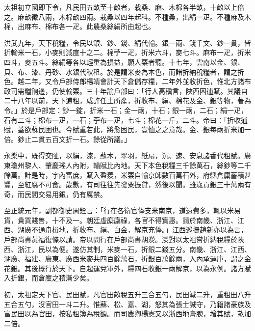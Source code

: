 太祖初立國即下令，凡民田五畝至十畝者，栽桑、麻、木棉各半畝，十畝以上倍之。麻畝徵八兩，木棉畝四兩。栽桑以四年起科。不種桑，出絹一疋。不種麻及木棉，出麻布、棉布各一疋。此農桑絲絹所由起也。

洪武九年，天下稅糧，令民以銀、鈔、錢、絹代輸。銀一兩、錢千文、鈔一貫，皆折輸米一石，小麥則減直十之二。棉苧一疋，折米六斗，麥七斗。麻布一疋，折米四斗，麥五斗。絲絹等各以輕重為損益，願人粟者聽。十七年，雲南以金、銀、貝、布、漆、丹砂、水銀代秋租。於是謂米麥為本色，而諸折納稅糧者，謂之折色。越二年，又令戶部侍郎楊靖會計天下倉儲存糧，二年外並收折色，惟北方諸布政司需糧餉邊，仍使輸粟。三十年諭戶部曰：「行人高稹言，陜西困逋賦。其議自二十八年以前，天下逋租，咸許任土所產，折收布、絹、棉花及金、銀等物，著為令。」於是戶部定：鈔一錠，折米一石；金一兩，十石；銀一兩，二石；絹一疋，石有二斗；棉布一疋，一石；苧布一疋，七斗；棉花一斤，二斗。帝曰：「折收逋賦，蓋欲蘇民困也。今賦重若此，將愈困民，豈恤之之意哉。金、銀每兩折米加一倍。鈔止二貫五百文折一石。餘從所議。」

永樂中，既得交阯，以絹，漆，蘇木，翠羽，紙扇，沉、速、安息諸香代租賦。廣東瓊州黎人、肇慶瑤人內附，輸賦比內地。天下本色稅糧三千餘萬石，絲鈔等二千餘萬。計是時，宇內富庶，賦入盈羨，米粟自輸京師數百萬石外，府縣倉廩蓄積甚豐，至紅腐不可食。歲歉，有司往往先發粟振貸，然後以聞。雖歲貢銀三十萬兩有奇，而民間交易用銀，仍有厲禁。

至正統元年，副都御史周銓言：「行在各衛官俸支米南京，道遠費多，輒以米易貨，貴買賤售，十不及一。朝廷虛糜廩祿，各官不得實惠。請於南畿、浙江、江西、湖廣不通舟楫地，折收布、絹、白金，解京充俸。」江西巡撫趙新亦以為言，戶部尚書黃福復條以請。帝以問行在戶部尚書胡濙。濙對以太祖嘗折納稅糧於陜西、浙江，民以為便。遂仿其制，米麥一石，折銀二錢五分。南畿、浙江、江西、湖廣、福建、廣東、廣西米麥共四百餘萬石，折銀百萬餘兩，入內承運庫，謂之金花銀。其後概行於天下。自起運兌軍外，糧四石收銀一兩解京，以為永例。諸方賦入折銀，而倉廩之積漸少矣。

初，太祖定天下官、民田賦，凡官田畝稅五升三合五勺，民田減二升，重租田八升五合五勺，沒官田一斗二升。惟蘇、松、嘉、湖，怒其為張士誠守，乃籍諸豪族及富民田以為官田，按私租簿為稅額。而司農卿楊憲又以浙西地膏腴，增其賦，畝加二倍。

